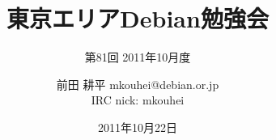 




\documentclass[cjk,dvipdfmx,12pt]{beamer}
\usepackage{monthlypresentation}



\title{東京エリアDebian勉強会}
\subtitle{第81回 2011年10月度}
\author{前田 耕平 mkouhei@debian.or.jp\\IRC nick: mkouhei}
\date{2011年10月22日}



